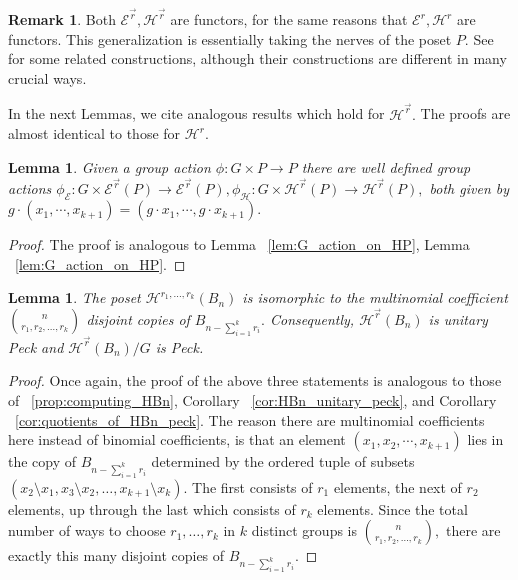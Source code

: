 \documentclass[10 pt]{amsart}
\theoremstyle{plain}
\newtheorem{lem}[thm]{Lemma}
\theoremstyle{definition}
\newtheorem{rem}[thm]{Remark}
\theoremstyle{remark}
\numberwithin{equation}{section}
\renewcommand{\vec}[1]{\overrightarrow{#1}}
\begin{document}
\begin{rem}
Both $\mathcal E^{\vec r},\mathcal H^{\vec r}$ are functors, for the same reasons that $\mathcal E^r, \mathcal H^r$ are functors. This generalization is essentially taking the nerves of the poset $P.$ See \cite{babson} for some related constructions, although their constructions are different in many crucial ways.
\end{rem}

In the next Lemmas, we cite analogous results which hold for $\mathcal H^{\vec r}.$ The proofs are almost identical to those for $\mathcal H^r.$

\begin{lem}
Given a group action $\phi:G \times P \rightarrow P$ there are well defined group actions $\phi_{\mathcal E}:G\times \mathcal E^{\vec r}(P) \rightarrow \mathcal E^{\vec r}(P),\phi_{\mathcal H}:G\times \mathcal H^{\vec r}(P) \rightarrow \mathcal H^{\vec r}(P),$ 
both given by $g \cdot (x_1, \cdots, x_{k+1}) =(g\cdot x_1, \cdots, g \cdot x_{k+1}).$
\end{lem}
\begin{proof}
The proof is analogous to Lemma ~\ref{lem:G_action_on_HP}, Lemma ~\ref{lem:G_action_on_HP}.
\end{proof}

\begin{lem}
\label{lem:peck_quotients_vector_f}
The poset $\mathcal H^{r_1,\ldots, r_k}(B_n)$ is isomorphic to the multinomial coefficient \linebreak $\binom n {r_1,r_2,\ldots, r_k}$ disjoint copies of $B_{n- \sum_{i=1}^k r_i}.$ Consequently, $\mathcal H^{\vec r}(B_n)$ is unitary Peck and $\mathcal H^{\vec r}(B_n)/G$ is Peck.
\end{lem}
\begin{proof}
Once again, the proof of the above three statements is analogous to those of ~\ref{prop:computing_HBn}, Corollary ~\ref{cor:HBn_unitary_peck}, and Corollary ~\ref{cor:quotients_of_HBn_peck}. The reason there are multinomial coefficients here instead of binomial coefficients, is that an element $(x_1, x_2, \cdots, x_{k+1})$ lies in the copy of $B_{n -\sum_{i=1}^k r_i}$ determined by the ordered tuple of subsets $(x_2 \setminus x_1,x_3 \setminus x_2, \ldots, x_{k+1} \setminus x_k).$ The first consists of $r_1$ elements, the next of $r_2$ elements, up through the last which consists of $r_k$ elements. Since the total number of ways to choose $r_1,\ldots, r_k$ in $k$ distinct groups is $\binom n {r_1,r_2,\ldots, r_k},$ there are exactly this many disjoint copies of $B_{n- \sum_{i=1}^k r_i}.$
\end{proof}
\end{document}
